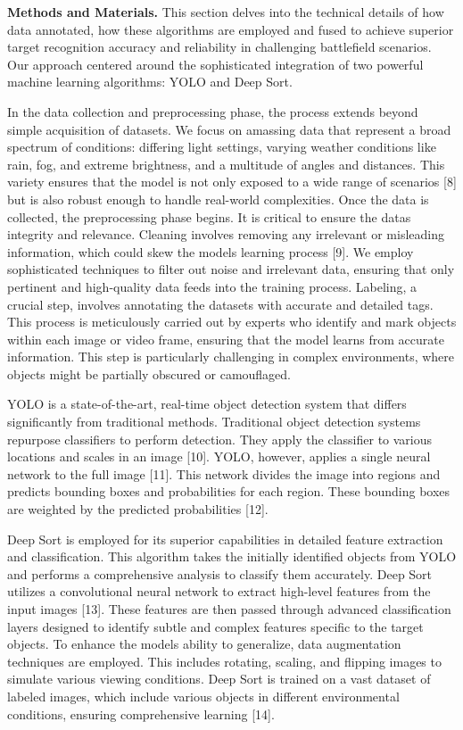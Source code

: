 \begin{multicols}{2}
{\bfseries Methods and Materials.} This section delves into the technical
details of how data annotated, how these algorithms are employed and
fused to achieve superior target recognition accuracy and reliability in
challenging battlefield scenarios. Our approach centered around the
sophisticated integration of two powerful machine learning algorithms:
YOLO and Deep Sort.

In the data collection and preprocessing phase, the process extends
beyond simple acquisition of datasets. We focus on amassing data that
represent a broad spectrum of conditions: differing light settings,
varying weather conditions like rain, fog, and extreme brightness, and a
multitude of angles and distances. This variety ensures that the model
is not only exposed to a wide range of scenarios {[}8{]} but is also
robust enough to handle real-world complexities. Once the data is
collected, the preprocessing phase begins. It is critical to ensure the
data\textquotesingle s integrity and relevance. Cleaning involves
removing any irrelevant or misleading information, which could skew the
model\textquotesingle s learning process {[}9{]}. We employ
sophisticated techniques to filter out noise and irrelevant data,
ensuring that only pertinent and high-quality data feeds into the
training process. Labeling, a crucial step, involves annotating the
datasets with accurate and detailed tags. This process is meticulously
carried out by experts who identify and mark objects within each image
or video frame, ensuring that the model learns from accurate
information. This step is particularly challenging in complex
environments, where objects might be partially obscured or camouflaged.

YOLO is a state-of-the-art, real-time object detection system that
differs significantly from traditional methods. Traditional object
detection systems repurpose classifiers to perform detection. They apply
the classifier to various locations and scales in an image {[}10{]}.
YOLO, however, applies a single neural network to the full image
{[}11{]}. This network divides the image into regions and predicts
bounding boxes and probabilities for each region. These bounding boxes
are weighted by the predicted probabilities {[}12{]}.

Deep Sort is employed for its superior capabilities in detailed feature
extraction and classification. This algorithm takes the initially
identified objects from YOLO and performs a comprehensive analysis to
classify them accurately. Deep Sort utilizes a convolutional neural
network to extract high-level features from the input images {[}13{]}.
These features are then passed through advanced classification layers
designed to identify subtle and complex features specific to the target
objects. To enhance the model\textquotesingle s ability to generalize,
data augmentation techniques are employed. This includes rotating,
scaling, and flipping images to simulate various viewing conditions.
Deep Sort is trained on a vast dataset of labeled images, which include
various objects in different environmental conditions, ensuring
comprehensive learning {[}14{]}.
\end{multicols}


